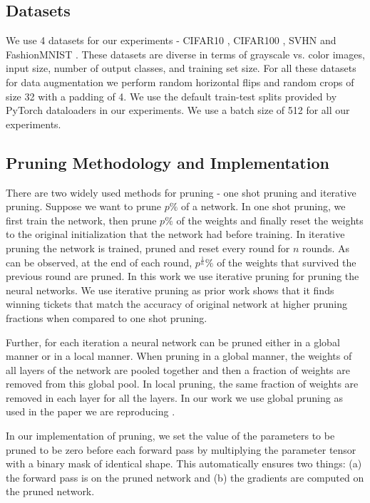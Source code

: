     \subsection{Datasets}
    We use 4 datasets for our experiments - CIFAR10 \cite{cifar}, CIFAR100 \cite{cifar}, SVHN \cite{svhn} and FashionMNIST \cite{fashionmnist}. These datasets are diverse in terms of grayscale vs. color images, input size, number of output classes,
    and training set size. For all these datasets for data augmentation we perform random horizontal flips and random crops of size 32 with a padding of 4. We use the default train-test splits provided by PyTorch dataloaders in our experiments. We use a batch size of 512 for all our experiments. 
    
    
    \subsection{Pruning Methodology and Implementation}
    There are two widely used methods for pruning - one shot pruning and iterative pruning. Suppose we want to prune $p\%$ of a network.  In one shot pruning, we first train the network, then prune $p\%$ of the weights and finally reset the weights to the original initialization that the network had before training. In iterative pruning the network is trained, pruned and reset every round for $n$ rounds. As can be observed, at the end of each round, $p^{\frac{1}{n}} \%$ of the weights that survived the previous round are pruned. In this work we use iterative pruning for pruning the neural networks.  We use iterative pruning as prior work \cite{lth_orig_paper} shows that it finds winning tickets that match the accuracy of original network at higher pruning fractions when compared to one shot pruning.
    
    Further, for each iteration a neural network can be pruned either in a global manner or in a local manner. When pruning in a global manner, the weights of all layers of the network are pooled together and then a fraction of weights are removed from this global pool. In local pruning, the same fraction of weights are removed in each layer for all the layers. In our work we use global pruning as used in the paper we are reproducing \cite{repro_paper}.
    
    In our implementation of pruning,  we set the value of the parameters to be pruned to be zero before each forward pass by multiplying the parameter tensor with a binary mask of identical shape. This automatically ensures two things: (a) the forward pass is on the pruned network and (b) the gradients are computed on the pruned network. 
    
